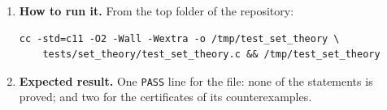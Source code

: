 \documentclass[11pt,a4paper]{article}
\begin{document}
\begin{enumerate}
\item \textbf{How to run it.} From the top folder of the repository:
\begin{verbatim}
cc -std=c11 -O2 -Wall -Wextra -o /tmp/test_set_theory \
    tests/set_theory/test_set_theory.c && /tmp/test_set_theory
\end{verbatim}

\item \textbf{Expected result.} One \texttt{PASS} line for the file: none of the statements is proved; and two for the certificates of its counterexamples.
\end{enumerate}
\end{document}

